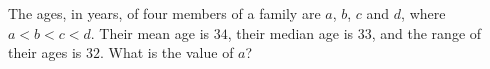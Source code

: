 The ages, in years, of four members of a family are $a$, $b$, $c$ and $d$, where $a<b<c<d$. Their mean age is $34$, their median age is $33$, and the range of their ages is $32$. What is the value of $a$?
